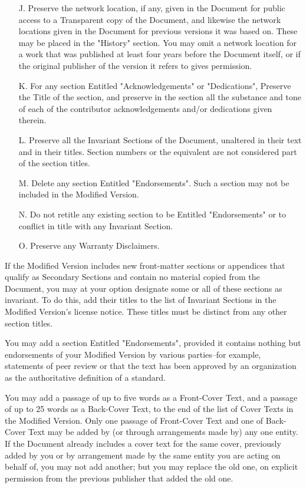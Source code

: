 \begin{itemize}
\item[J.]
   Preserve the network location, if any, given in the Document for
   public access to a Transparent copy of the Document, and likewise
   the network locations given in the Document for previous versions
   it was based on.  These may be placed in the "History" section.
   You may omit a network location for a work that was published at
   least four years before the Document itself, or if the original
   publisher of the version it refers to gives permission.
   
\item[K.]
   For any section Entitled "Acknowledgements" or "Dedications",
   Preserve the Title of the section, and preserve in the section all
   the substance and tone of each of the contributor acknowledgements
   and/or dedications given therein.
   
\item[L.]
   Preserve all the Invariant Sections of the Document,
   unaltered in their text and in their titles.  Section numbers
   or the equivalent are not considered part of the section titles.
   
\item[M.]
   Delete any section Entitled "Endorsements".  Such a section
   may not be included in the Modified Version.
   
\item[N.]
   Do not retitle any existing section to be Entitled "Endorsements"
   or to conflict in title with any Invariant Section.
   
\item[O.]
   Preserve any Warranty Disclaimers.
\end{itemize}

If the Modified Version includes new front-matter sections or
appendices that qualify as Secondary Sections and contain no material
copied from the Document, you may at your option designate some or all
of these sections as invariant.  To do this, add their titles to the
list of Invariant Sections in the Modified Version's license notice.
These titles must be distinct from any other section titles.

You may add a section Entitled "Endorsements", provided it contains
nothing but endorsements of your Modified Version by various
parties--for example, statements of peer review or that the text has
been approved by an organization as the authoritative definition of a
standard.

You may add a passage of up to five words as a Front-Cover Text, and a
passage of up to 25 words as a Back-Cover Text, to the end of the list
of Cover Texts in the Modified Version.  Only one passage of
Front-Cover Text and one of Back-Cover Text may be added by (or
through arrangements made by) any one entity.  If the Document already
includes a cover text for the same cover, previously added by you or
by arrangement made by the same entity you are acting on behalf of,
you may not add another; but you may replace the old one, on explicit
permission from the previous publisher that added the old one.

